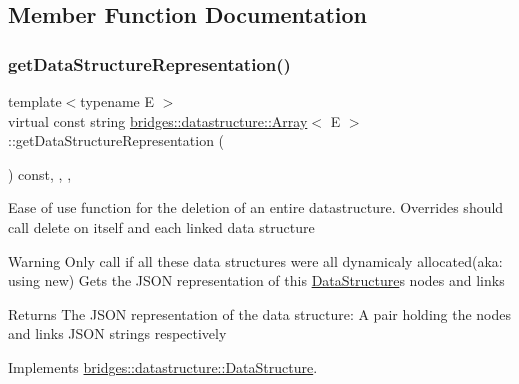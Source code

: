 \subsection{Member Function Documentation}
\mbox{\label{classbridges_1_1datastructure_1_1_array_a210de6729fa08715c13d2deb0b141010}} 
\subsubsection{\texorpdfstring{get\+Data\+Structure\+Representation()}{getDataStructureRepresentation()}}
{\footnotesize\ttfamily template$<$typename E $>$ \\
virtual const string \hyperlink{classbridges_1_1datastructure_1_1_array}{bridges\+::datastructure\+::\+Array}$<$ E $>$\+::get\+Data\+Structure\+Representation (\begin{DoxyParamCaption}{ }\end{DoxyParamCaption}) const\hspace{0.3cm}{\ttfamily [inline]}, {\ttfamily [final]}, {\ttfamily [override]}, {\ttfamily [virtual]}}

Ease of use function for the deletion of an entire datastructure. Overrides should call delete on itself and each linked data structure

\begin{DoxyWarning}{Warning}
Only call if all these data structures were all dynamicaly allocated(aka\+: using new) Gets the J\+S\+ON representation of this \hyperlink{classbridges_1_1datastructure_1_1_data_structure}{Data\+Structure}\textquotesingle{}s nodes and links
\end{DoxyWarning}
\begin{DoxyReturn}{Returns}
The J\+S\+ON representation of the data structure\+: A pair holding the nodes and links J\+S\+ON strings respectively 
\end{DoxyReturn}


Implements \hyperlink{classbridges_1_1datastructure_1_1_data_structure}{bridges\+::datastructure\+::\+Data\+Structure}.

\mbox{\label{classbridges_1_1datastructure_1_1_array_aa2a14939c8e53087e833ebf71822a057}} 
